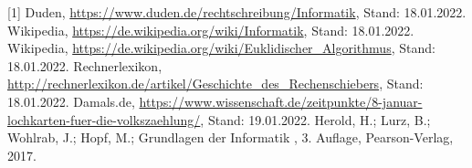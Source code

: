 \documentclass[12pt]{scrartcl}
\begin{document}
[1] Duden, \url{https://www.duden.de/rechtschreibung/Informatik}, Stand: 18.01.2022.
\newline
[2] Wikipedia, \url{https://de.wikipedia.org/wiki/Informatik}, Stand: 18.01.2022.
\newline
[3] Wikipedia, \url{https://de.wikipedia.org/wiki/Euklidischer_Algorithmus}, Stand: 18.01.2022.
\newline
[4] Rechnerlexikon, \url{http://rechnerlexikon.de/artikel/Geschichte_des_Rechenschiebers}, Stand: 18.01.2022.
\newline
[5] Damals.de, \url{https://www.wissenschaft.de/zeitpunkte/8-januar-lochkarten-fuer-die-volkszaehlung/}, Stand: 19.01.2022.
\newline
[6] Herold, H.; Lurz, B.; Wohlrab, J.; Hopf, M.; \glqq Grundlagen der Informatik \grqq , 3. Auflage, Pearson-Verlag, 2017.

 
\end{document}
